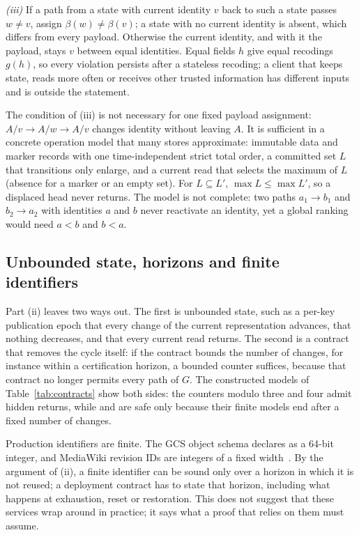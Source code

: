 \emph{(iii)} If a path from a state with current identity $v$ back to such a
state passes $w\ne v$, assign $\beta(w)\ne\beta(v)$; a state with no current
identity is absent, which differs from every payload. Otherwise the current
identity, and with it the payload, stays $v$ between equal identities. Equal
fields $h$ give equal recodings $g(h)$, so every violation persists after a
stateless recoding; a client that keeps state, reads more often or receives
other trusted information has different inputs and is outside the statement.

The condition of (iii) is not necessary for one fixed payload assignment:
$A/v\to A/w\to A/v$ changes identity without leaving $A$. It is sufficient in
a concrete operation model that many stores approximate: immutable data and
marker records with one time-independent strict total order, a committed set
$L$ that transitions only enlarge, and a current read that selects the maximum
of $L$ (absence for a marker or an empty set). For $L\subseteq L'$,
$\max L\le\max L'$, so a displaced head never returns. The model is not
complete: two paths $a_1\to b_1$ and $b_2\to a_2$ with identities $a$ and $b$
never reactivate an identity, yet a global ranking would need $a<b$ and $b<a$.

\subsection{Unbounded state, horizons and finite identifiers}
Part (ii) leaves two ways out. The first is unbounded state, such as a
per-key publication epoch that every change of the current representation
advances, that nothing decreases, and that every current read returns. The
second is a contract that removes the cycle itself: if the contract bounds the
number of changes, for instance within a certification horizon, a bounded
counter suffices, because that contract no longer permits every path of $G$.
The constructed models of Table~\ref{tab:contracts} show both sides: the
counters modulo three and four admit hidden returns, while
 and  are safe only because their
finite models end after a fixed number of changes.

Production identifiers are finite. The GCS object schema declares
 as a 64-bit integer, and MediaWiki revision IDs are
integers of a fixed width~\cite{gcsschema,mediawikirevision}. By the argument
of (ii), a finite identifier can be sound only over a horizon in which it is
not reused; a deployment contract has to state that horizon, including what
happens at exhaustion, reset or restoration. This does not suggest that these
services wrap around in practice; it says what a proof that relies on them
must assume.


